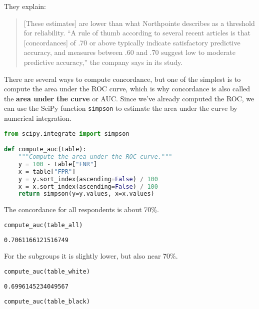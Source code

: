 They explain:

\begin{quote}
{[}These estimates{]} are lower than what Northpointe describes as a
threshold for reliability. ``A rule of thumb according to several recent
articles is that {[}concordances{]} of .70 or above typically indicate
satisfactory predictive accuracy, and measures between .60 and .70
suggest low to moderate predictive accuracy,'' the company says in its
study.
\end{quote}

There are several ways to compute concordance, but one of the simplest
is to compute the area under the ROC curve, which is why concordance is
also called the \textbf{area under the curve} or AUC. Since we've
already computed the ROC, we can use the SciPy function
\passthrough{\lstinline!simpson!} to estimate the area under the curve
by numerical integration.

\begin{lstlisting}[language=Python,style=source]
from scipy.integrate import simpson

def compute_auc(table):
    """Compute the area under the ROC curve."""
    y = 100 - table["FNR"]
    x = table["FPR"]
    y = y.sort_index(ascending=False) / 100
    x = x.sort_index(ascending=False) / 100
    return simpson(y=y.values, x=x.values)
\end{lstlisting}

The concordance for all respondents is about 70\%.

\begin{lstlisting}[language=Python,style=source]
compute_auc(table_all)
\end{lstlisting}

\begin{lstlisting}[style=output]
0.7061166121516749
\end{lstlisting}

For the subgroups it is slightly lower, but also near 70\%.

\begin{lstlisting}[language=Python,style=source]
compute_auc(table_white)
\end{lstlisting}

\begin{lstlisting}[style=output]
0.6996145234049567
\end{lstlisting}

\begin{lstlisting}[language=Python,style=source]
compute_auc(table_black)
\end{lstlisting}

